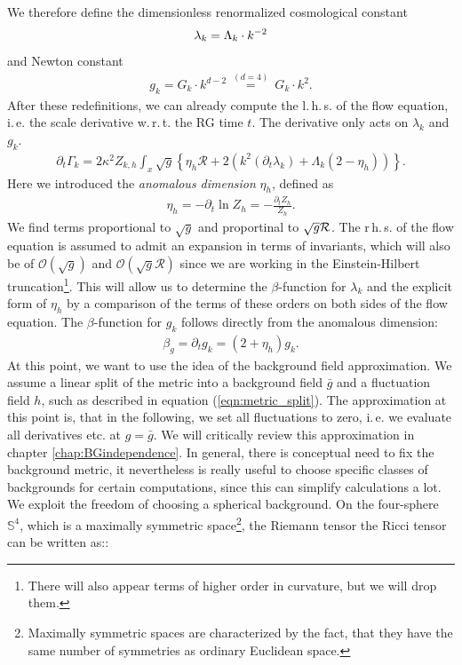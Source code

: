 We therefore define the dimensionless renormalized cosmological constant 
\begin{align}
	\lambda_k = \Lambda_k\cdot k^{-2}
\end{align}
and Newton constant
\begin{align}
	g_k = G_k\cdot k^{d-2} \ \overset{(d=4)}{=} \ G_k\cdot k^{2}.
\end{align}
After these redefinitions, we can already compute the l.\,h.\,s. of the flow equation, i.\,e. the scale derivative w.\,r.\,t. the RG time $t$. The derivative only acts on $\lambda_k$ and $g_k$.
\begin{align}
	\partial_{t}\Gamma_{k} = 2\kappa^2 Z_{k,h}\int_x \sqrt{g} \left\{\eta_h\mathcal{R}+2\left(k^2(\partial_t\lambda_k) + \Lambda_k(2 - \eta_h)\right)\right\}.
\end{align}
Here we introduced the \textit{anomalous dimension} $\eta_h$, defined as
\begin{align}
	\eta_h=-\partial_t \ln Z_h = -\frac{\partial_tZ_h}{Z_h}.
\end{align} 
We find terms proportional to $\sqrt{g}$ and proportinal to $\sqrt{g}\mathcal{R}$. The r\,h.\,s. of the flow equation is assumed to admit an expansion in terms of invariants, which will also be of $\mathcal{O}\left(\sqrt{g}\right)$ and  $\mathcal{O}\left(\sqrt{g}\mathcal{R}\right)$ since we are working in the Einstein-Hilbert truncation\footnote{There will also appear terms of higher order in curvature, but we will drop them.}. This will allow us to determine the $\beta$-function for $\lambda_k$ and the explicit form of $\eta_h$ by a comparison of the terms of these orders on both sides of the flow equation.
The $\beta$-function for $g_k$ follows directly from the anomalous dimension:
\begin{align}
	\beta_g = \partial_t g_k = \left(2 + \eta_h\right)g_k.
\end{align}
At this point, we want to use the idea of the background field approximation. We assume a linear split of the metric into a background field $\bar{g}$ and a fluctuation field $h$, such as described in  equation (\ref{eqn:metric_split}). The approximation at this point is, that in the following, we set all fluctuations to zero, i.\,e. we evaluate all derivatives etc. at $g=\bar{g}$. We will critically review this approximation in chapter \ref{chap:BGindependence}. In general, there is conceptual need to fix the background metric, it nevertheless is really useful to choose specific classes of backgrounds for certain computations, since this can simplify calculations a lot. We exploit the freedom of choosing a spherical background. On the four-sphere $\mathbb{S}^4$, which is a maximally symmetric space\footnote{Maximally symmetric spaces are characterized by the fact, that they have the same number of symmetries as ordinary Euclidean space.}, the Riemann tensor the Ricci tensor can be written  as::
